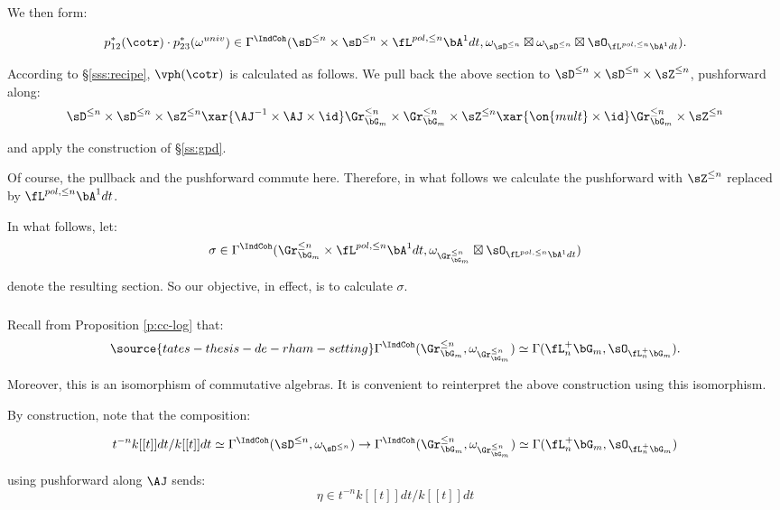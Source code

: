  We then form:

\[
p_{12}^*(\cotr) \cdot p_{23}^*(\omega^{univ}) \in
\Gamma^{\IndCoh}(\sD^{\leq n} \times \sD^{\leq n} \times
\fL^{pol,\leq n} \bA^1 dt,
\omega_{\sD^{\leq n}} \boxtimes \omega_{\sD^{\leq n}} \boxtimes
\sO_{\fL^{pol,\leq n} \bA^1 dt}).
\]

According to \S \ref{sss:recipe}, $\vph(\cotr)$ is calculated as follows.
We pull back the above section to $\sD^{\leq n} \times \sD^{\leq n} \times
\sZ^{\leq n}$, pushforward along:
%
\[
\sD^{\leq n} \times \sD^{\leq n} \times \sZ^{\leq n}
\xar{\AJ^{-1} \times \AJ \times \id}
\Gr_{\bG_m}^{\leq n} \times \Gr_{\bG_m}^{\leq n}
\times \sZ^{\leq n} \xar{\on{mult} \times \id}
\Gr_{\bG_m}^{\leq n} \times \sZ^{\leq n}
\]

 and apply the construction of \S \ref{ss:gpd}.

Of course, the pullback and the pushforward commute here.
Therefore, in what follows we calculate the pushforward with $\sZ^{\leq n}$
replaced by $\fL^{pol,\leq n} \bA^1 dt$.

In what follows, let:
%
\[
\sigma \in \Gamma^{\IndCoh}(\Gr_{\bG_m}^{\leq n} \times \fL^{pol,\leq n} \bA^1 dt,
\omega_{\Gr_{\bG_m}^{\leq n}} \boxtimes \sO_{\fL^{pol,\leq n} \bA^1 dt})
\]

 denote the resulting section. So our objective, in effect, is to calculate
$\sigma$.

\subsubsection{}

Recall from Proposition \ref{p:cc-log} that:
%
\begin{equation}\label{eq:gr-cc}
\source{tates-thesis-de-rham-setting}
\Gamma^{\IndCoh}(\Gr_{\bG_m}^{\leq n},\omega_{\Gr_{\bG_m}^{\leq n}}) \simeq
\Gamma(\fL_n^+ \bG_m,\sO_{\fL_n^+ \bG_m}).
\end{equation}

 Moreover, this is an isomorphism of commutative algebras. It is
convenient to reinterpret the above construction using this isomorphism.

By construction, note that the composition:

\[
t^{-n}k[[t]]dt/k[[t]]dt \simeq
\Gamma^{\IndCoh}(\sD^{\leq n},\omega_{\sD^{\leq n}}) \to
\Gamma^{\IndCoh}(\Gr_{\bG_m}^{\leq n},\omega_{\Gr_{\bG_m}^{\leq n}})
\simeq \Gamma(\fL_n^+ \bG_m,\sO_{\fL_n^+ \bG_m})
\]

 using pushforward along $\AJ$ sends:
%
\[
\eta \in t^{-n}k[[t]]dt/k[[t]]dt
\]

